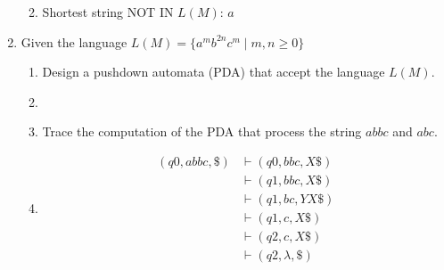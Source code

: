 \documentclass[a4paper, 12pt]{article}
\makeatletter
\renewenvironment{proof}[1][\proofname]{\par
  \normalfont \topsep6\p@\@plus6\p@\relax
  \trivlist
  \item[\hskip\labelsep
        \itshape
    #1\@addpunct{.}]\ignorespaces
}{%
  \endtrivlist\@endpefalse
}
\renewcommand{\proofname}{Solution:}
\makeatother
\begin{document}
\begin{enumerate}
\begin{center}
\begin{enumerate}
\begin{proof}
                    Shortest string NOT IN $L(M)$: $a$
                \end{proof}
        \end{enumerate}
        \end{center}

        \item Given the language \(L(M) = \{a^mb^{2n}c^m \mid m, n \geq 0\}\)
        \begin{enumerate}
            \item Design a pushdown automata (PDA) that accept the language $L(M)$.
                \begin{proof}
                    \leavevmode

                    \begin{center}
                    \end{center}
                \end{proof}
            \item Trace the computation of the PDA that process the string $abbc$ and $abc$.
                \begin{proof}
                    \begin{align*}
                        (q0, abbc, \$) &\vdash (q0, bbc, X\$) \\
                        &\vdash (q1, bbc, X\$) \\
                        &\vdash (q1, bc, YX\$) \\
                        &\vdash (q1, c, X\$) \\
                        &\vdash (q2, c, X\$) \\
                        &\vdash (q2, \lambda, \$)
                    \end{align*}


\end{proof}
\end{enumerate}
\end{enumerate}
\end{document}
